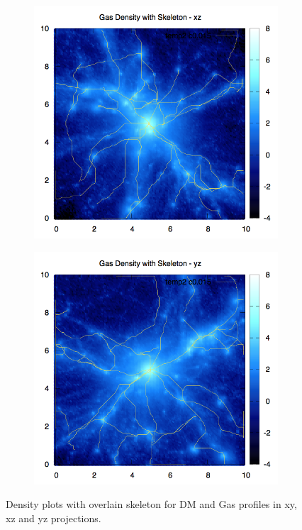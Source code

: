 \documentclass[journal]{IEEEtran}
\begin{document}
\begin{figure}[t!]
\begin{subfigure}[t]{0.3\textwidth}
	\end{subfigure}
	\quad
	\begin{subfigure}[t]{0.3\textwidth}
		\centering
		\includegraphics[width=\linewidth]{GasDenSkelxz.png}
	\end{subfigure}
	\quad
	\begin{subfigure}[t]{0.3\textwidth}
		\centering
		\includegraphics[width=\linewidth]{GasDenSkelyz.png}
	\end{subfigure}
\label{fig:densities}
\caption{Density plots with overlain skeleton for DM and Gas profiles in xy, xz and yz projections.}
\end{figure}
\end{document}
